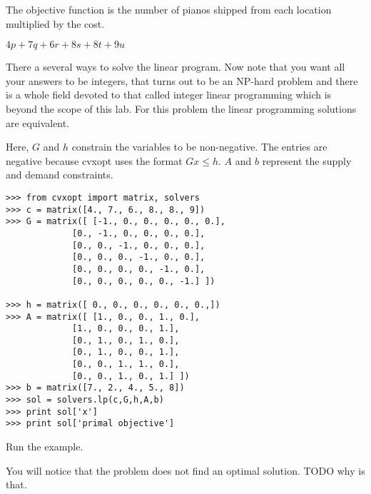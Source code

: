 The objective function is the number of pianos shipped from each location multiplied by the cost.

\begin{center}
$4p + 7q + 6r + 8s + 8t + 9u$
\end{center}

There a several ways to solve the linear program. Now note that you want all your answers to be integers, that turns out to be an NP-hard problem and there is a whole field devoted to that called integer linear programming which is beyond the scope of this lab. For this problem the linear programming solutions are equivalent. 

Here, $G$ and $h$ constrain the variables to be non-negative.
The entries are negative because cvxopt uses the format $Gx \leq h$.
$A$ and $b$ represent the supply and demand constraints.


\begin{lstlisting}
>>> from cvxopt import matrix, solvers
>>> c = matrix([4., 7., 6., 8., 8., 9])
>>> G = matrix([ [-1., 0., 0., 0., 0., 0.],
             [0., -1., 0., 0., 0., 0.],
             [0., 0., -1., 0., 0., 0.],
             [0., 0., 0., -1., 0., 0.],
             [0., 0., 0., 0., -1., 0.],
             [0., 0., 0., 0., 0., -1.] ])
        
>>> h = matrix([ 0., 0., 0., 0., 0., 0.,])
>>> A = matrix([ [1., 0., 0., 1., 0.],
             [1., 0., 0., 0., 1.],
             [0., 1., 0., 1., 0.],
             [0., 1., 0., 0., 1.],
             [0., 0., 1., 1., 0.],
             [0., 0., 1., 0., 1.] ])
>>> b = matrix([7., 2., 4., 5., 8]) 
>>> sol = solvers.lp(c,G,h,A,b)  
>>> print sol['x']
>>> print sol['primal objective']
\end{lstlisting}

Run the example.

You will notice that the problem does not find an optimal solution. TODO why is that.

